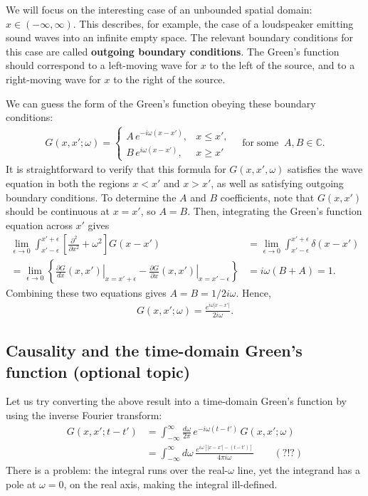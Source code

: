 \documentclass[10pt,a4paper]{article}
\begin{document}
We will focus on the interesting case of an unbounded spatial domain:
$x \in (-\infty, \infty)$. This describes, for example, the case of a
loudspeaker emitting sound waves into an infinite empty space. The
relevant boundary conditions for this case are called \textbf{outgoing
  boundary conditions}.  The Green's function should correspond to a
left-moving wave for $x$ to the left of the source, and to a
right-moving wave for $x$ to the right of the source.

We can guess the form of the Green's function obeying these boundary
conditions:
\begin{align}
  G(x,x';\omega) = \left\{\begin{array}{ll}A \, e^{-i\omega (x-x')}, & x \le x', \\ B \, e^{i\omega (x-x')}, & x \ge x'\end{array}\right. \quad \mathrm{for}\;\mathrm{some}\;\; A, B \in \mathbb{C}.
\end{align}
It is straightforward to verify that this formula for $G(x,x',\omega)$
satisfies the wave equation in both the regions $x < x'$ and $x > x'$,
as well as satisfying outgoing boundary conditions.  To determine the
$A$ and $B$ coefficients, note that $G(x,x')$ should be continuous at
$x = x'$, so $A = B$. Then, integrating the Green's function equation
across $x'$ gives
\begin{align}
  \lim_{\epsilon \rightarrow 0} \int_{x'-\epsilon}^{x'+\epsilon} \left[\frac{\partial^2}{\partial x^2} + \omega^2\right]G(x-x') &= \lim_{\epsilon \rightarrow 0} \int_{x'-\epsilon}^{x'+\epsilon} \delta(x-x') \\
  = \lim_{\epsilon \rightarrow 0} \left\{ \left.\frac{\partial G}{dx} (x,x') \right|_{x = x'+\epsilon} - \left.\frac{\partial G}{\partial x} (x,x') \right|_{x = x'-\epsilon}\right\} &= i\omega (B + A) = 1.
\end{align}
Combining these two equations gives $A = B = 1/2i\omega$.  Hence,
\begin{align}
  G(x,x';\omega) = \frac{e^{i\omega |x-x'|}}{2i\omega}.
\end{align}

\subsection{Causality and the time-domain Green's function (optional topic)}
\label{causality-and-the-time-domain-greens-function}

Let us try converting the above result into a time-domain Green's
function by using the inverse Fourier transform:
\begin{align}
  G(x,x';t-t') &= \int_{-\infty}^\infty \frac{d\omega}{2\pi} \, e^{-i\omega (t-t')} \, G(x,x'; \omega) \\
  &= \int_{-\infty}^\infty d\omega \, \frac{e^{i\omega \left[|x-x'| - (t-t')\right]}}{4\pi i\omega}\qquad (?!?)
\end{align}
There is a problem: the integral runs over the real-$\omega$ line, yet
the integrand has a pole at $\omega = 0$, on the real axis, making the
integral ill-defined.
\end{document}
